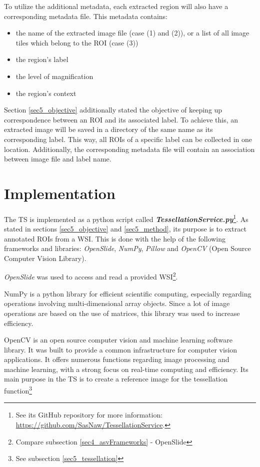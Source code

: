 To utilize the additional metadata, each extracted region will also have a corresponding metadata file. This metadata contains:
\begin{itemize}
	\item the name of the extracted image file (case (1) and (2)), or a list of all image tiles which belong to the ROI (case (3))
	\item the region's label
	\item the level of magnification
	\item the region's context
\end{itemize}

Section \ref{sec5_objective} additionally stated the objective of keeping up correspondence between an ROI and its associated label. To achieve this, an extracted image will be saved in a directory of the same name as its corresponding label. This way, all ROIs of a specific label can be collected in one location. Additionally, the corresponding metadata file will contain an association between image file and label name.


\section{Implementation}
\label{sec5_impl}
The TS is implemented as a python script called \textbf{\emph{TessellationService.py}}\footnote{
	See its GitHub repository for more information: \url{https://github.com/SasNaw/TessellationService}.
}. As stated in sections \ref{sec5_objective} and \ref{sec5_method}, its purpose is to extract annotated ROIs from a WSI. This is done with the help of the following frameworks and libraries: \emph{OpenSlide}, \emph{NumPy}, \emph{Pillow} and \emph{OpenCV} (Open Source Computer Vision Library).

\emph{OpenSlide} was used to access and read a provided WSI\footnote {
	Compare subsection \ref{sec4_asvFrameworks} - OpenSlide
}.

NumPy is a python library for efficient scientific computing, especially regarding operations involving multi-dimensional array objects\cite{Walt11}. Since a lot of image operations are based on the use of matrices, this library was used to increase efficiency.

OpenCV is an open source computer vision and machine learning software library. It was built to provide a common infrastructure for computer vision applications. It offers numerous functions regarding image processing and machine learning, with a strong focus on real-time computing and efficiency\cite{Bradski08}. Its main purpose in the TS is to create a reference image for the tessellation function\footnote{
	See subsection \ref{sec5_tessellation}
}

